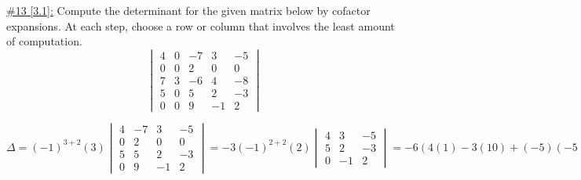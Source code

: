 \documentclass{exam}
\begin{document}
\underline{\#13 [3.1]:} Compute the determinant for the given matrix below by cofactor expansions. At each step, choose a row or column that involves the least amount of computation. 
\[
    \begin{vmatrix}
        4 & 0 & -7 & 3 & -5 \\
        0 & 0 & 2 & 0 & 0 \\
        7 & 3 & -6 & 4 & -8 \\
        5 & 0 & 5 & 2 & -3 \\
        0 & 0 & 9 & -1 & 2
    \end{vmatrix}
\]
\begin{solution}
    \[
        \Delta = (-1)^{3+2}(3)\begin{vmatrix}
            4 & -7 & 3 & -5 \\
            0 & 2 & 0 & 0 \\
            5 & 5 & 2 & -3 \\
            0 & 9 & -1 & 2
        \end{vmatrix} 
        = -3(-1)^{2+2}(2)\begin{vmatrix}
            4 & 3 & -5 \\
            5 & 2 & -3 \\
            0 & -1 & 2
        \end{vmatrix}
        = -6\left(4(1) - 3(10) + (-5)(-5)\right) = \boxed{6}
    \]
\end{solution}
\end{document}
